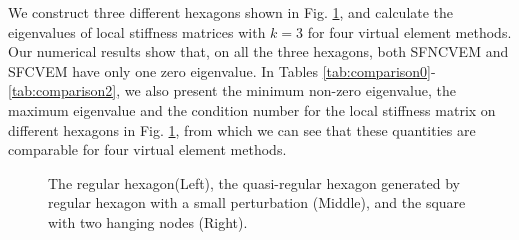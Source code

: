 \documentclass[10pt]{amsart}
\numberwithin{equation}{section}
\begin{document}
We construct three different hexagons shown in Fig. \ref{fig:hexagon}, and calculate the eigenvalues of local stiffness matrices with $k=3$ for four virtual element methods. Our numerical results show that, on all the three hexagons, both SFNCVEM and SFCVEM have only one zero eigenvalue. In Tables \ref{tab:comparison0}-\ref{tab:comparison2}, we also present the minimum non-zero eigenvalue, the maximum eigenvalue and the condition number for the local stiffness matrix on different hexagons in Fig. \ref{fig:hexagon}, from which we can see that these quantities are comparable for four virtual element methods.
\begin{figure}[htbp]
\;\;%
{}
\;\;%
{}
\caption{The regular hexagon(Left), the quasi-regular hexagon generated by regular
    hexagon with a small perturbation (Middle), 
and the square with two hanging nodes (Right).}
\label{fig:hexagon}
\end{figure}
\end{document}
